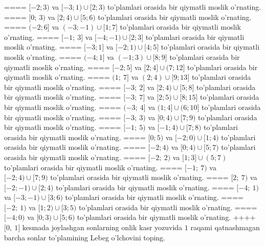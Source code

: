 ====
\(\lbrack - 2;3)\) va \(\lbrack - 3;1) \cup \lbrack 2;3)\) to'plamlari orasida bir qiymatli moslik o'rnating.
====
\(\lbrack 0;\ 3)\) va \(\lbrack 2;4) \cup \lbrack 5;6)\) to'plamlari orasida bir qiymatli moslik o'rnating.
====
\(( - 2;6\rbrack\) va \(( - 3; - 1) \cup \lbrack 1;7\rbrack\) to'plamlari orasida bir qiymatli moslik o'rnating.
====
\(\lbrack - 1;\ 3\rbrack\) va \(\lbrack - 4; - 1) \cup \lbrack 2;3\rbrack\) to'plamlari orasida bir qiymatli moslik o'rnating.
====
\(\lbrack - 3;1\rbrack\) va \(\lbrack - 2;1) \cup \lbrack 4;5\rbrack\) to'plamlari orasida bir qiymatli moslik o'rnating.
====
\(( - 4;1\rbrack\) va \(( - 1;3) \cup \lbrack 8;9\rbrack\) to'plamlari orasida bir qiymatli moslik o'rnating.
====
\(\lbrack - 2;5\rbrack\) va \(\lbrack 2;4\rbrack \cup (7;12\rbrack\) to'plamlari orasida bir qiymatli moslik o'rnating.
====
\((1;\ 7\rbrack\) va \((2;4) \cup \lbrack 9;13\rbrack\) to'plamlari orasida bir qiymatli moslik o'rnating.
====
\(\lbrack - 3;\ 2\rbrack\) va \(\lbrack 2;4) \cup \lbrack 5;8\rbrack\) to'plamlari orasida bir qiymatli moslik o'rnating.
====
\(\lbrack - 3;\ 7\rbrack\) va \(\lbrack 2;5) \cup \lbrack 8;15\rbrack\) to'plamlari orasida bir qiymatli moslik o'rnating.
====
\(( - 3;\ 4\rbrack\) va \((1;4\rbrack \cup (6;10\rbrack\) to'plamlari orasida bir qiymatli moslik o'rnating.
====
\(\lbrack - 3;\ 3)\) va \(\lbrack 0;4) \cup \lbrack 7;9)\) to'plamlari orasida bir qiymatli moslik o'rnating.
====
\(\lbrack - 1;\ 5)\) va \(\lbrack - 1;4) \cup \lbrack 7;8)\) to'plamlari orasida bir qiymatli moslik o'rnating.
====
\(\lbrack 0;5)\) va \(\lbrack - 2;0) \cup \lbrack 1;4)\) to'plamlari orasida bir qiymatli moslik o'rnating.
====
\(\lbrack - 2;4)\) va \(\lbrack 0;4) \cup \lbrack 5;7)\) to'plamlari orasida bir qiymatli moslik o'rnating.
====
\(\lbrack - 2;\ 2)\) va \(\lbrack 1;3\rbrack \cup (5;7)\) to'plamlari orasida bir qiymatli moslik o'rnating.
====
\(\lbrack - 1;\ 7)\) va \(\lbrack - 2;4) \cup \lbrack 7;9)\) to'plamlari orasida bir qiymatli moslik o'rnating.
====
\(\lbrack 2;\ 7)\) va \(\lbrack - 2; - 1) \cup \lbrack 2;4)\) to'plamlari orasida bir qiymatli moslik o'rnating.
====
\(\lbrack - 4;\ 1)\) va \(\lbrack - 3; - 1) \cup \lbrack 3;6)\) to'plamlari orasida bir qiymatli moslik o'rnating.
====
\(\lbrack - 2;\ 1)\) va \(\lbrack 1;2) \cup \lbrack 3;5)\) to'plamlari orasida bir qiymatli moslik o'rnating.
====
\(\lbrack - 4;0)\) va \(\lbrack 0;3) \cup \lbrack 5;6)\) to'plamlari orasida bir qiymatli moslik o'rnating.
++++
\(\lbrack 0,\ 1\rbrack\) kesmada joylashgan sonlarning onlik kasr yozuvida \(1\) raqami qatnashmagan barcha sonlar to'plamining Lebeg o'lchovini toping.
